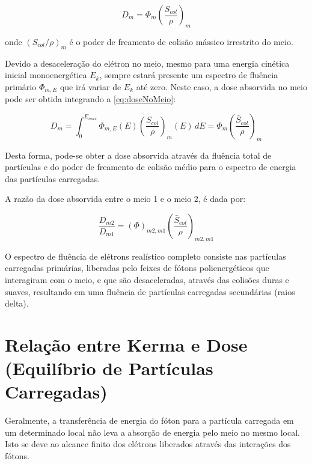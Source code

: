 \documentclass[11pt,a4paper]{article}
\begin{document}
			\begin{equation}
				D_m = \Phi_m \left(\frac{S_{col}}{\rho}\right)_m
				\label{eq:doseNoMeio}
			\end{equation}

		\noindent onde $(S_{col}/\rho)_m$ é o poder de freamento de colisão mássico irrestrito do meio.

		Devido a desaceleração do elétron no meio, mesmo para uma energia cinética inicial monoenergética $E_k$, sempre estará presente um espectro de fluência primário $\Phi_{m,E}$ que irá variar de $E_k$ até zero. Neste caso, a dose absorvida no meio pode ser obtida integrando a   \ref{eq:doseNoMeio}:

			\begin{equation}
				D_{m}= \int_{0}^{E_{max}} \Phi_{m, E}(E)\left(\frac{S_{col}}{\rho}\right)_{m}(E)  \,dE
				= \Phi_m \left(\frac{\bar{S}_{col}}{\rho}\right)_m
				\label{eq:doseAbsorvidaNoMeio}
			\end{equation}

		Desta forma, pode-se obter a dose absorvida através da fluência total de partículas e do poder de freamento de colisão médio para o espectro de energia das partículas carregadas. 

		A razão da dose absorvida entre o meio 1 e o meio 2, é dada por:

			\begin{equation}
				\frac{D_{m2}}{D_{m1}} = (\Phi)_{m2,m1} \left(\frac{\bar{S}_{col}}{\rho}\right)_{m2,m1}
			\end{equation}


		O espectro de fluência de elétrons realístico completo consiste nas partículas carregadas primárias, liberadas pelo feixes de fótons polienergéticos que interagiram com o meio, e que são desaceleradas, através das colisões duras e suaves, resultando em uma fluência de partículas carregadas secundárias (raios delta). 
		
		

	\section{Relação entre Kerma e Dose (Equilíbrio de Partículas Carregadas)}
		

		Geralmente, a transferência de energia do fóton para a partícula carregada em um determinado local não leva a absorção de energia pelo meio no mesmo local. Isto se deve ao alcance finito dos elétrons liberados através das interações dos fótons.
\end{document}

